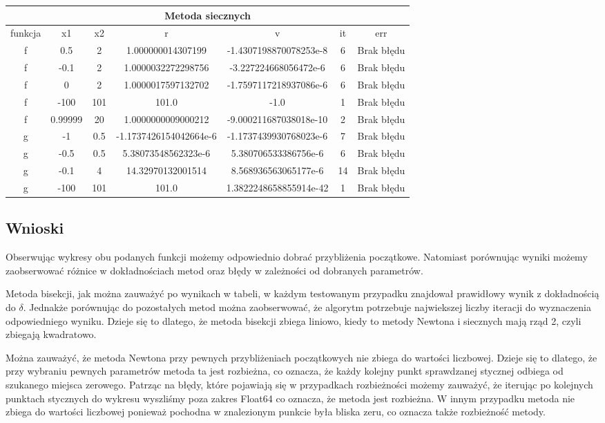 \documentclass[11pt, a4paper]{article}
\begin{document}
    \begin{center}
        \begin{tabular}{|c|c|c|c|c|c|c|}
            \hline
            \multicolumn{7}{|c|}{Metoda siecznych}\\
            \hline
            funkcja & x1 & x2 & r & v & it & err\\
            \hline
            f & 0.5 & 2 & 1.000000014307199 & -1.4307198870078253e-8 & 6 & Brak błędu\\
            f & -0.1 & 2 & 1.0000032272298756 & -3.227224668056472e-6 & 6 & Brak błędu\\
            f & 0 & 2 & 1.0000017597132702 & -1.7597117218937086e-6 & 6 & Brak błędu\\
            f & -100 & 101 & 101.0 & -1.0 & 1 & Brak błędu\\
            f & 0.99999 & 20 & 1.0000000009000212 & -9.000211687038018e-10 & 2 & Brak błędu\\
            \hline
            g & -1 & 0.5 & -1.1737426154042664e-6 & -1.1737439930768023e-6 & 7 & Brak błędu\\
            g & -0.5 & 0.5 & 5.38073548562323e-6 & 5.380706533386756e-6 & 6 & Brak błędu\\
            g & -0.1 & 4 & 14.32970132001514 & 8.568936563065177e-6 & 14 & Brak błędu\\
            g & -100 & 101 & 101.0 & 1.3822248658855914e-42 & 1 & Brak błędu\\
            \hline
        \end{tabular}
    \end{center}
    \subsection{Wnioski}
    Obserwując wykresy obu podanych funkcji możemy odpowiednio dobrać przybliżenia początkowe. Natomiast porównując wyniki możemy zaobserwować różnice w dokładnościach metod oraz błędy w zależności od dobranych parametrów.

     Metoda bisekcji, jak można zauważyć po wynikach w tabeli, w każdym testowanym przypadku znajdował prawidłowy wynik z dokładnością do $\delta$. Jednakże porównując do pozostałych metod można zaobserwować, że algorytm potrzebuje najwiekszej liczby iteracji do wyznaczenia odpowiedniego wyniku. Dzieje się to dlatego, że metoda bisekcji zbiega liniowo, kiedy to metody Newtona i siecznych mają rząd 2, czyli zbiegają kwadratowo.

     Można zauważyć, że metoda Newtona przy pewnych przybliżeniach początkowych nie zbiega do wartości liczbowej. Dzieje się to dlatego, że przy wybraniu pewnych parametrów metoda ta jest rozbieżna, co oznacza, że każdy kolejny punkt sprawdzanej stycznej odbiega od szukanego miejsca zerowego. Patrząc na błędy, które pojawiają się w przypadkach rozbieżności możemy zauważyć, że iterując po kolejnych punktach stycznych do wykresu wyszliśmy poza zakres Float64 co oznacza, że metoda jest rozbieżna. W innym przypadku metoda nie zbiega do wartości liczbowej ponieważ pochodna w znalezionym punkcie była bliska zeru, co oznacza także rozbieżność metody. 
\end{document}
